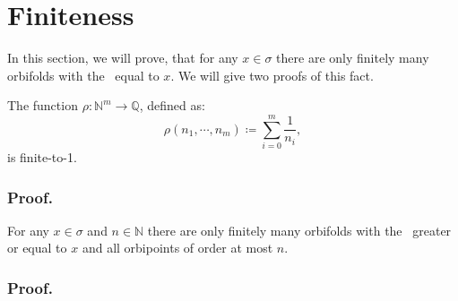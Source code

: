 \section{Finiteness}\label{finiteness}

In this section, we will prove, that for any $x \in \sigma$ there are only finitely many orbifolds 
with the \Eoc\ equal to $x$. We will give two proofs of this fact. 


\begin{lemma}\label{sum_of_reciprocals_lemma}
The function $\rho:\mathbb{N}^m \to \mathbb{Q}$, defined as:
\begin{equation}
\rho(n_1, \cdots, n_m) \coloneqq \sum_{i = 0}^m \frac{1}{n_i},
\end{equation} 
is finite-to-1.
\end{lemma}
\subsubsection{Proof.}





\begin{observation}\label{first_finiteness_theorem}
For any $x \in \sigma$ and $n \in \mathbb{N}$ there are only finitely many orbifolds 
with the \Eoc\ greater or equal to $x$ and all orbipoints of order at most $n$.
\end{observation}
\subsubsection{Proof.} 

